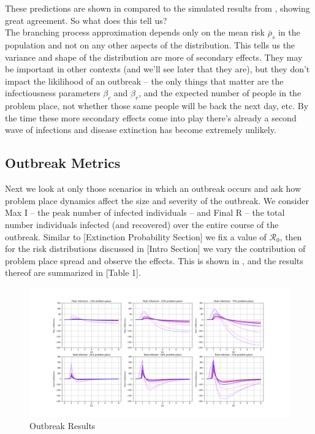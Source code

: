 \documentclass{article}
\begin{document}
These predictions are shown in  compared
to the simulated results from , showing
great agreement. So what does this tell us?\\


The branching process approximation depends only on the mean risk
$\bar\rho_s$ in the population and not on any other aspects of
the distribution. This tells us the variance and shape of the distribution
are more of secondary effects. They may be important in other contexts (and
we'll see later that they are), but they don't impact the likilihood of an
outbreak – the only things that matter are the infectiousness parameters
$\beta_c$ and $\beta_r$, and the expected number of people in the problem place,
not whether those same people will be back the next day, etc. By the time
these more secondary effects come into play there's already a second
wave of infections and disease extinction has become extremely unlikely.



\subsection{Outbreak Metrics}

Next we look at only those scenarios in which an outbreak occurs and ask how
problem place dynamics affect the size and severity of the outbreak. We consider
Max I – the peak number of infected individuals – and Final R – the total number
individuals infected (and recovered) over the entire course of the outbreak.
Similar to [Extinction Probability Section] we fix a value of $\mathcal{R}_0$, then for
the risk distributions discussed in [Intro Section] we vary the contribution
of problem place spread and observe the effects. This is shown in ,
and the results thereof are summarized in [Table 1].



\begin{figure}
\centering
\includegraphics[width=\textwidth]{outbreakresults}
\caption{Outbreak Results}
\label{fig:outbreak_results}
\end{figure}
\end{document}

